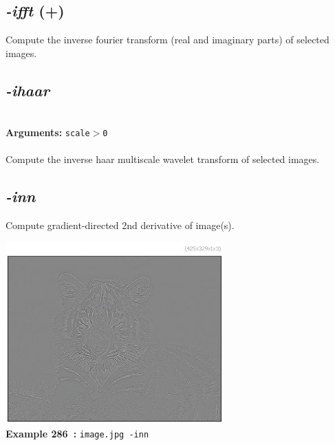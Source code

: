 \documentclass[a4paper,11pt,twoside]{book}
\begin{document}
\subsection{\emph{-ifft} (+)}\vspace*{-0.5em}
Compute the inverse fourier transform (real and imaginary parts) of selected images.


\subsection{\emph{-ihaar} }\vspace*{-0.5em}
~\\\textbf{Arguments: } 
{\small \texttt{scale$>$0}}\\~\\
Compute the inverse haar multiscale wavelet transform of selected images.


\subsection{\emph{-inn} }\vspace*{-0.5em}
Compute gradient-directed 2nd derivative of image(s).
\begin{center}\includegraphics[keepaspectratio=true,height=7cm,width=\textwidth]{img/gmic_def286.jpg}\\
{\footnotesize \textbf{Example 286~:} \texttt{image.jpg -inn}}
\end{center}
\end{document}
